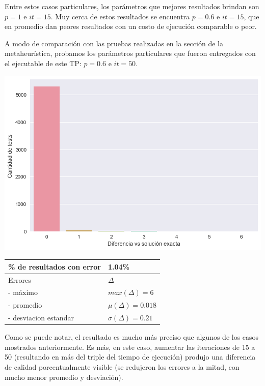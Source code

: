 Entre estos casos particulares, los parámetros que mejores resultados brindan son $p = 1$ e $it = 15$. Muy cerca de estos resultados se encuentra $p = 0.6$ e $it = 15$, que en promedio dan peores resultados con un costo de ejecución comparable o peor.

A modo de comparación con las pruebas realizadas en la sección de la metaheurística, probamos los parámetros particulares que fueron entregados con el ejecutable de este TP: $p = 0.6$ e $it = 50$.

\noindent
\begin{minipage}{0.55\textwidth}
    \hfill
    \includegraphics[scale=0.55]{img/accuracy-grasp50.png}
\end{minipage}
\hfill
\begin{minipage}{0.44\textwidth}
    \begin{center}

        \begin{tabular}{ | l l |}
            \hline
            \% de resultados con error & 1.04\% \\ \hline
            Errores & $\Delta$ \\
            - máximo & $max(\Delta) = 6$ \\
            - promedio & $\mu(\Delta) = 0.018$ \\
            - desviacion estandar & $\sigma(\Delta) = 0.21$ \\
            \hline
        \end{tabular}
    \end{center}
\end{minipage}

Como se puede notar, el resultado es mucho más preciso que algunos de los casos mostrados anteriormente. Es más, en este caso, aumentar las iteraciones de 15 a 50 (resultando en más del triple del tiempo de ejecución) produjo una diferencia de calidad porcentualmente visible (se redujeron los errores a la mitad, con mucho menor promedio y desviación).

